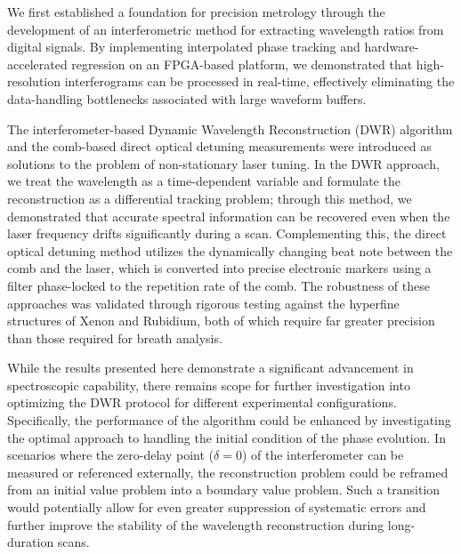\documentclass[12pt]{report}
\begin{document}
	We first established a foundation for precision metrology through the development of an interferometric method for extracting wavelength ratios from digital signals. By implementing interpolated phase tracking and hardware-accelerated regression on an FPGA-based platform, we demonstrated that high-resolution interferograms can be processed in real-time, effectively eliminating the data-handling bottlenecks associated with large waveform buffers.
	
	The interferometer-based Dynamic Wavelength Reconstruction (DWR) algorithm and the comb-based direct optical detuning measurements were introduced as solutions to the problem of non-stationary laser tuning. In the DWR approach, we treat the wavelength as a time-dependent variable and formulate the reconstruction as a differential tracking problem; through this method, we demonstrated that accurate spectral information can be recovered even when the laser frequency drifts significantly during a scan. Complementing this, the direct optical detuning method utilizes the dynamically changing beat note between the comb and the laser, which is converted into precise electronic markers using a filter phase-locked to the repetition rate of the comb. The robustness of these approaches was validated through rigorous testing against the hyperfine structures of Xenon and Rubidium, both of which require far greater precision than those required for breath analysis.
	
	
	While the results presented here demonstrate a significant advancement in spectroscopic capability, there remains scope for further investigation into optimizing the DWR protocol for different experimental configurations. Specifically, the performance of the algorithm could be enhanced by investigating the optimal approach to handling the initial condition of the phase evolution. In scenarios where the zero-delay point ($\delta = 0$) of the interferometer can be measured or referenced externally, the reconstruction problem could be reframed from an initial value problem into a boundary value problem. Such a transition would potentially allow for even greater suppression of systematic errors and further improve the stability of the wavelength reconstruction during long-duration scans.
	
\end{document}
